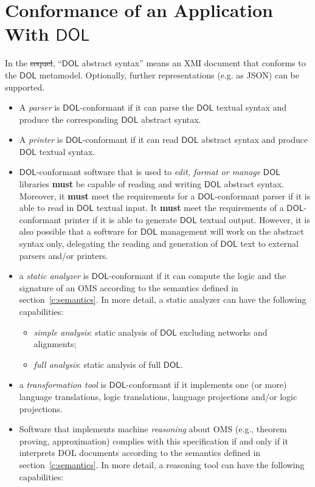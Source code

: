 \documentclass[10pt,fleqn,final]{scrreprt}
\newcommand*{\hasto}{\textbf{must}\xspace}
\newcommand*{\DOL}{\ensuremath{\mathsf{DOL}}\xspace}
\newcommand{\sclause}[1]{\section{#1}}
\providecommand{\DIFadd}[1]{{\protect\color{blue}\uwave{#1}}} %
\providecommand{\DIFdel}[1]{{\protect\color{red}\sout{#1}}}                      %
\providecommand{\DIFaddbegin}{} %
\providecommand{\DIFaddend}{} %
\providecommand{\DIFdelbegin}{} %
\providecommand{\DIFdelend}{} %
\begin{document}
\sclause{Conformance of an Application With \DOL}\label{c:conform:application}


In the \DIFdelbegin \DIFdel{sequel}\DIFdelend \DIFaddbegin \DIFadd{following}\DIFaddend , ``\DOL abstract syntax'' means an XMI document that
conforms to the \DOL metamodel. Optionally, further representations
(e.g. as JSON) can be supported.
\begin{itemize}
\item
A \emph{parser} is \DOL-conformant if it can parse the \DOL textual syntax and produce the corresponding \DOL abstract syntax.
\item
A \emph{printer} is \DOL-conformant if it can read \DOL abstract syntax and produce \DOL textual syntax.
\item
{\DOL}-conformant software that is used to \emph{edit, format or manage} \DOL libraries \hasto be capable of reading and writing \DOL abstract syntax. Moreover, it \hasto meet the requirements for a \DOL-conformant parser if it is able to read in \DOL textual input. It \hasto meet the requirements of a \DOL-conformant printer if it is able to generate \DOL textual output. However, it is also possible that a software for \DOL management will work on the abstract syntax only, delegating the reading and generation of \DOL text to external parsers and/or printers.
\item a \emph{static analyzer} is \DOL-conformant if it can compute
  the logic and the signature of an OMS according to the semantics
  defined in section~\ref{c:semantics}. In more detail, a static analyzer
  can have the following capabilities:
\begin{itemize}
\item \emph{simple analysis}: static analysis of \DOL excluding networks and alignments;
\item \emph{full analysis}: static analysis of full \DOL.
\end{itemize}
\item a \emph{transformation tool} is \DOL-conformant if it implements
one (or more) language translations, logic translations, language
projections and/or logic projections.
\item
Software that implements machine \emph{reasoning} about OMS (e.g., theorem proving, approximation)  complies with this specification if and only if it interprets  DOL documents according to the semantics defined in section~\ref{c:semantics}. In more detail, a reasoning tool can have the following capabilities:
\begin{itemize}

\end{itemize}
\end{itemize}
\end{document}
